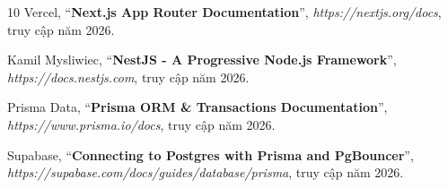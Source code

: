 \documentclass[a4paper,12pt]{article}
\begin{document}
\thispagestyle{empty}
\clearpage
\tableofcontents
\clearpage
\listoffigures
\listoftables
\clearpage


\begin{thebibliography}{10}
Vercel, ``\textbf{Next.js App Router Documentation}'', \textit{https://nextjs.org/docs}, truy cập năm 2026.

Kamil Mysliwiec, ``\textbf{NestJS - A Progressive Node.js Framework}'', \textit{https://docs.nestjs.com}, truy cập năm 2026.

Prisma Data, ``\textbf{Prisma ORM \& Transactions Documentation}'', \textit{https://www.prisma.io/docs}, truy cập năm 2026.

Supabase, ``\textbf{Connecting to Postgres with Prisma and PgBouncer}'', \textit{https://supabase.com/docs/guides/database/prisma}, truy cập năm 2026.
\end{thebibliography}
\end{document}
